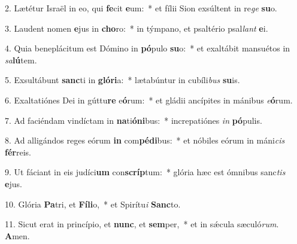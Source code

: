 2. Lætétur Israël in eo, qui \textbf{fe}cit \textbf{e}um:~*  et fílii Sion exsúltent in re\textit{ge} \textbf{su}o.\

3. Laudent nomen \textbf{e}jus in \textbf{cho}ro:~*  in týmpano, et psaltério psal\textit{lant} \textbf{e}i.\

4. Quia beneplácitum est Dómino in \textbf{pó}pulo \textbf{su}o:~*  et exaltábit mansuétos in \textit{sa}\textbf{lú}tem.\

5. Exsultábunt \textbf{sanc}ti in \textbf{gló}\textbf{ri}a:~*  lætabúntur in cubíli\textit{bus} \textbf{su}is.\

6. Exaltatiónes Dei in gúttu\textbf{re} e\textbf{ó}rum:~*  et gládii ancípites in mánibus \textit{e}\textbf{ó}rum.\

7. Ad faciéndam vindíctam in \textbf{na}ti\textbf{ó}\textbf{ni}bus:~*  increpatiónes \textit{in} \textbf{pó}pulis.\

8. Ad alligándos reges eórum \textbf{in} com\textbf{pé}\textbf{di}bus:~*  et nóbiles eórum in máni\textit{cis} \textbf{fér}reis.\

9. Ut fáciant in eis judíci\textbf{um} con\textbf{scríp}tum:~*  glória hæc est ómnibus sanc\textit{tis} \textbf{e}jus.\

10. Glória \textbf{Pa}tri, et \textbf{Fí}\textbf{li}o,~*  et Spirítu\textit{i} \textbf{Sanc}to.\

11. Sicut erat in princípio, et \textbf{nunc}, et \textbf{sem}per,~*  et in sǽcula sæculó\textit{rum}. \textbf{A}men.\

